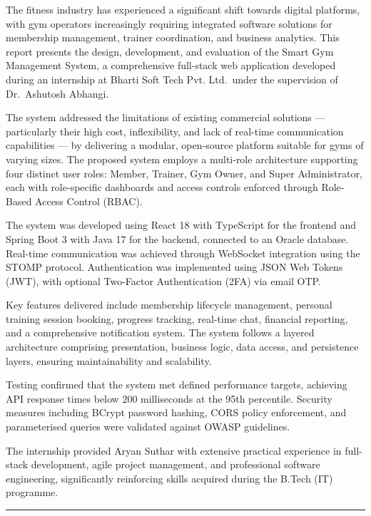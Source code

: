 \documentclass[
  12pt,
  a4paperpaper,
]{report}
\begin{document}
The fitness industry has experienced a significant shift towards digital
platforms, with gym operators increasingly requiring integrated software
solutions for membership management, trainer coordination, and business
analytics. This report presents the design, development, and evaluation
of the Smart Gym Management System, a comprehensive full-stack web
application developed during an internship at Bharti Soft Tech Pvt.
Ltd.~under the supervision of Dr.~Ashutosh Abhangi.

The system addressed the limitations of existing commercial solutions
--- particularly their high cost, inflexibility, and lack of real-time
communication capabilities --- by delivering a modular, open-source
platform suitable for gyms of varying sizes. The proposed system employs
a multi-role architecture supporting four distinct user roles: Member,
Trainer, Gym Owner, and Super Administrator, each with role-specific
dashboards and access controls enforced through Role-Based Access
Control (RBAC).

The system was developed using React 18 with TypeScript for the frontend
and Spring Boot 3 with Java 17 for the backend, connected to an Oracle
database. Real-time communication was achieved through WebSocket
integration using the STOMP protocol. Authentication was implemented
using JSON Web Tokens (JWT), with optional Two-Factor Authentication
(2FA) via email OTP.

Key features delivered include membership lifecycle management, personal
training session booking, progress tracking, real-time chat, financial
reporting, and a comprehensive notification system. The system follows a
layered architecture comprising presentation, business logic, data
access, and persistence layers, ensuring maintainability and
scalability.

Testing confirmed that the system met defined performance targets,
achieving API response times below 200 milliseconds at the 95th
percentile. Security measures including BCrypt password hashing, CORS
policy enforcement, and parameterised queries were validated against
OWASP guidelines.

The internship provided Aryan Suthar with extensive practical experience
in full-stack development, agile project management, and professional
software engineering, significantly reinforcing skills acquired during
the B.Tech (IT) programme.

\smallskip\noindent

\rule{\textwidth}{0.4pt}
\end{document}
